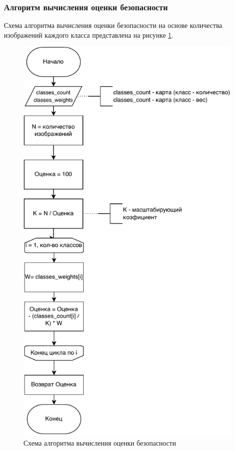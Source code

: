 \subsubsection{Алгоритм вычисления оценки безопасности}
Схема алгоритма вычисления оценки безопасности на основе количества изображений каждого класса представлена на рисунке \ref{fig:assesment}.

\begin{figure}[hbtp]
	\centering
	\includegraphics[scale=1]{img/assesment.pdf}
	\caption{Схема алгоритма вычисления оценки безопасности}
	\label{fig:assesment}
\end{figure}
\clearpage

